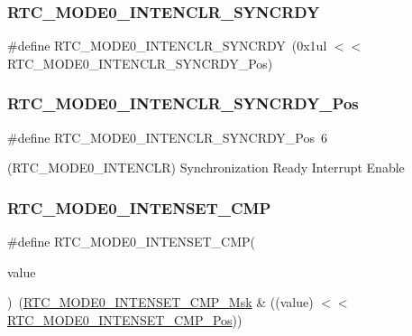 \subsubsection{\texorpdfstring{RTC\_MODE0\_INTENCLR\_SYNCRDY}{RTC\_MODE0\_INTENCLR\_SYNCRDY}}
{\footnotesize\ttfamily \#define R\+T\+C\+\_\+\+M\+O\+D\+E0\+\_\+\+I\+N\+T\+E\+N\+C\+L\+R\+\_\+\+S\+Y\+N\+C\+R\+DY~(0x1ul $<$$<$ R\+T\+C\+\_\+\+M\+O\+D\+E0\+\_\+\+I\+N\+T\+E\+N\+C\+L\+R\+\_\+\+S\+Y\+N\+C\+R\+D\+Y\+\_\+\+Pos)}

\mbox{\label{group___s_a_m_d21___r_t_c_ga40c91a2503fed53944268c88bd39d16f}} 
\subsubsection{\texorpdfstring{RTC\_MODE0\_INTENCLR\_SYNCRDY\_Pos}{RTC\_MODE0\_INTENCLR\_SYNCRDY\_Pos}}
{\footnotesize\ttfamily \#define R\+T\+C\+\_\+\+M\+O\+D\+E0\+\_\+\+I\+N\+T\+E\+N\+C\+L\+R\+\_\+\+S\+Y\+N\+C\+R\+D\+Y\+\_\+\+Pos~6}



(R\+T\+C\+\_\+\+M\+O\+D\+E0\+\_\+\+I\+N\+T\+E\+N\+C\+LR) Synchronization Ready Interrupt Enable 

\mbox{\label{group___s_a_m_d21___r_t_c_gabf27c28f941fc2a7a091ed7ee0418fda}} 
\subsubsection{\texorpdfstring{RTC\_MODE0\_INTENSET\_CMP}{RTC\_MODE0\_INTENSET\_CMP}}
{\footnotesize\ttfamily \#define R\+T\+C\+\_\+\+M\+O\+D\+E0\+\_\+\+I\+N\+T\+E\+N\+S\+E\+T\+\_\+\+C\+MP(\begin{DoxyParamCaption}\item[{}]{value }\end{DoxyParamCaption})~(\mbox{\hyperlink{group___s_a_m_d21___r_t_c_gadb7a972905c2e549aaff1355358b66ae}{R\+T\+C\+\_\+\+M\+O\+D\+E0\+\_\+\+I\+N\+T\+E\+N\+S\+E\+T\+\_\+\+C\+M\+P\+\_\+\+Msk}} \& ((value) $<$$<$ \mbox{\hyperlink{group___s_a_m_d21___r_t_c_gaac99a4ba6781229ea22960ac65244ace}{R\+T\+C\+\_\+\+M\+O\+D\+E0\+\_\+\+I\+N\+T\+E\+N\+S\+E\+T\+\_\+\+C\+M\+P\+\_\+\+Pos}}))}

